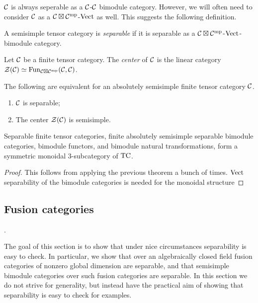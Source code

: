 \documentclass{amsart}
\begin{document}
$\mathcal C$ is always seperable as a $\mathcal C$-$\mathcal C$ bimodule category.  However, we will often need to consider $\mathcal C$ as a $\mathcal C \boxtimes \mathcal C^{\mathrm{mp}}$-$\mathrm{Vect}$ as well.  This suggests the following definition.

\begin{definition}
	A semisimple tensor category is {\em separable} if it is separable as a $\mathcal C \boxtimes \mathcal C^{\mathrm{mp}}$-$\mathrm{Vect}$-bimodule category.  
\end{definition}


\begin{definition}
	Let $\mathcal C$ be a finite tensor category. The {\em center} of $\mathcal C$ is the linear category $\mathcal Z(\mathcal C) \simeq \operatorname{Fun}_{\mathcal C \boxtimes \mathcal C^{\mathrm{mp}}}(\mathcal C, \mathcal C)$.
\end{definition}

\begin{corollary}
	The following are equivalent for an absolutely semisimple finite tensor category $\mathcal C$.
	\begin{enumerate}
		\item $\mathcal C$ is separable;
		\item The center $\mathcal Z(\mathcal C)$ is semisimple.
	\end{enumerate} 
\end{corollary}

\begin{theorem}
Separable finite tensor categories, finite absolutely semisimple separable bimodule categories, bimodule functors, and bimodule natural transformations, form a symmetric monoidal $3$-subcategory of $\mathrm{TC}$.
\end{theorem}
\begin{proof}
This follows from applying the previous theorem a bunch of times.  $\mathrm{Vect}$ separability of the bimodule categories is needed for the monoidal structure
\end{proof}


\subsection{Fusion categories} \label{sec-tc-fusion}.%

The goal of this section is to show that under nice circumstances separability is easy to check.  In particular, we show that over an algebraically closed field fusion categories of nonzero global dimension are separable, and that semisimple bimodule categories over such fusion categories are separable.  In this section we do not strive for generality, but instead have the practical aim of showing that separability is easy to check for examples.
\end{document}
